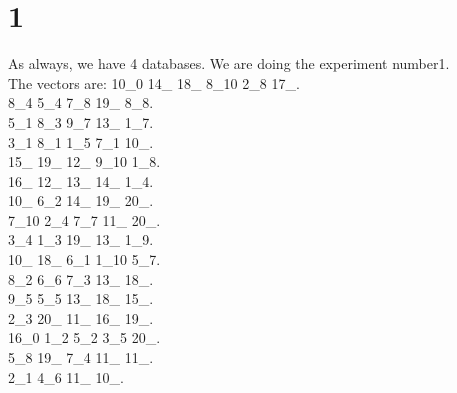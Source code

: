 \chapter{1}
\indent As always, we have 4 databases. We are doing the experiment number1.\\
The vectors are:
10\_0 14\_ 18\_ 8\_10 2\_8 17\_.\\8\_4 5\_4 7\_8 19\_ 8\_8.\\5\_1 8\_3 9\_7 13\_ 1\_7.\\3\_1 8\_1 1\_5 7\_1 10\_.\\15\_ 19\_ 12\_ 9\_10 1\_8.\\16\_ 12\_ 13\_ 14\_ 1\_4.\\10\_ 6\_2 14\_ 19\_ 20\_.\\7\_10 2\_4 7\_7 11\_ 20\_.\\3\_4 1\_3 19\_ 13\_ 1\_9.\\10\_ 18\_ 6\_1 1\_10 5\_7.\\8\_2 6\_6 7\_3 13\_ 18\_.\\9\_5 5\_5 13\_ 18\_ 15\_.\\2\_3 20\_ 11\_ 16\_ 19\_.\\16\_0 1\_2 5\_2 3\_5 20\_.\\5\_8 19\_ 7\_4 11\_ 11\_.\\2\_1 4\_6 11\_ 10\_.\\